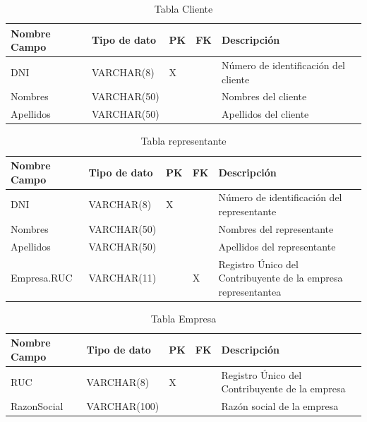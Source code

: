 \documentclass[12pt]{article}
\begin{document}
\begin{table}[htbp]
    \begin{center}
        \begin{tabular}{|p{3cm}|p{3cm}|p{1cm}|p{1cm}|p{6cm}|}
            \hline
            Nombre Campo & Tipo de dato & PK & FK & Descripción \\
            \hline
            DNI & VARCHAR(8) & X &  & Número de identificación del cliente \\
            Nombres & VARCHAR(50) &  &  & Nombres del cliente \\
            Apellidos & VARCHAR(50) &  &  & Apellidos del cliente \\
            \hline
            \end{tabular}
        \caption{Tabla Cliente}
        \label{tab:tablas}
    \end{center}
\end{table}


\begin{table}[htbp]
    \begin{center}
        \begin{tabular}{|p{3cm}|p{3cm}|p{1cm}|p{1cm}|p{6cm}|}
            \hline
            Nombre Campo & Tipo de dato & PK & FK & Descripción \\
            \hline
            DNI & VARCHAR(8) & X &  & Número de identificación del representante \\
            Nombres & VARCHAR(50) &  &  & Nombres del representante \\
            Apellidos & VARCHAR(50) &  &  & Apellidos del representante \\
            Empresa.RUC & VARCHAR(11) &  & X & Registro Único del Contribuyente de la empresa representantea \\
            \hline
            \end{tabular}
        \caption{Tabla representante}
        \label{tab:tablas}
    \end{center}
\end{table}


\begin{table}[htbp]
    \begin{center}
        \begin{tabular}{|p{3cm}|p{3cm}|p{1cm}|p{1cm}|p{6cm}|}
            \hline
            Nombre Campo & Tipo de dato & PK & FK & Descripción \\
            \hline
            RUC & VARCHAR(8) & X &  & Registro Único del Contribuyente de la empresa \\
            RazonSocial & VARCHAR(100) &  &  & Razón social de la empresa \\
            \hline
            \end{tabular}
        \caption{Tabla Empresa}
        \label{tab:tablas}
    \end{center}
\end{table}
\end{document}
